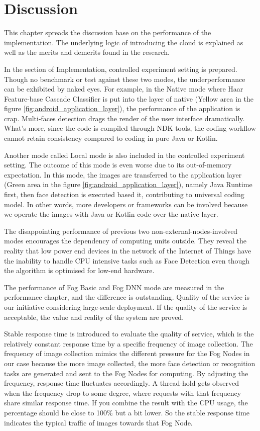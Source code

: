 \chapter{Discussion} \label{chap:discussion}
This chapter spreads the discussion base on the performance of the implementation. The underlying logic of introducing the cloud is explained as well as the merits and demerits found in the research.

In the section of Implementation, controlled experiment setting is prepared. Though no benchmark or test against these two modes, the underperformance can be exhibited by naked eyes. For example, in the Native mode where Haar Feature-base Cascade Classifier is put into the layer of native (Yellow area in the figure \ref{fig:android_application_layer}), the performance of the application is crap. Multi-faces detection drags the render of the user interface dramatically. What's more, since the code is compiled through NDK tools, the coding workflow cannot retain consistency compared to coding in pure Java or Kotlin.

Another mode called Local mode is also included in the controlled experiment setting. The outcome of this mode is even worse due to its out-of-memory expectation. In this mode, the images are transferred to the application layer (Green area in the figure \ref{fig:android_application_layer}), namely Java Runtime first, then face detection is executed based it, contributing to universal coding model. In other words, more developers or frameworks can be involved because we operate the images with Java or Kotlin code over the native layer.

The disappointing performance of previous two non-external-nodes-involved modes encourages the dependency of computing units outside. They reveal the reality that low power end devices in the network of the Internet of Things have the inability to handle CPU intensive tasks such as Face Detection even though the algorithm is optimised for low-end hardware.

The performance of Fog Basic and Fog DNN mode are measured in the performance chapter, and the difference is outstanding. Quality of the service is our initiative considering large-scale deployment. If the quality of the service is acceptable, the value and reality of the system are proved.

Stable response time is introduced to evaluate the quality of service, which is the relatively constant response time by a specific frequency of image collection. The frequency of image collection mimics the different pressure for the Fog Nodes in our case because the more image collected, the more face detection or recognition tasks are generated and sent to the Fog Nodes for computing. By adjusting the frequency, response time fluctuates accordingly. A thread-hold gets observed when the frequency drop to some degree, where requests with that frequency share similar response time. If you combine the result with the CPU usage, the percentage should be close to 100\% but a bit lower. So the stable response time indicates the typical traffic of images towards that Fog Node.

